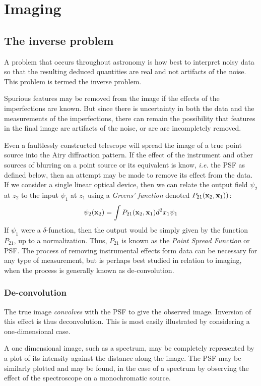 \chapter{Imaging}

\section{The inverse problem}

A problem that occurs throughout astronomy is how best to interpret noisy data so that the resulting deduced quantities are real and not artifacts of the noise. This problem is termed the inverse problem. 

Spurious features may be removed from the image if the effects of the imperfections are known. But since there is uncertainty in both the data and the measurements of the imperfections, there can remain the possibility that features in the final image are artifacts of the noise, or are are incompletely removed.

Even a faultlessly constructed telescope will spread the image of a true point source into the Airy diffraction pattern. If the effect of the instrument and other sources of blurring on a point source or its equivalent is know, {\it i.e.} the PSF as defined below, then an attempt may be made to remove its effect from the data. If we consider a single linear optical device, then we can relate the output field $\psi_2$ at $z_2$ to the input $\psi_1$ at $z_1$ using a {\it Greens' function} denoted $P_{21}({\bf x}_2,{\bf x}_1))$: 
\[
\psi_2({\bf x}_2)=\int P_{21}({\bf x}_2,{\bf x}_1)d^2x_1\psi_1
\]
If $\psi_1$ were a $\delta$-function, then the output would be simply given by the function $P_{21}$, up to a normalization. Thus, $P_{21}$ is known as the {\it Point Spread Function} or PSF. The process of removing instrumental effects form data can be necessary for any type of measurement, but is perhaps best studied in relation to imaging, when the process is generally known as de-convolution.

\subsection{De-convolution}

The true image {\it convolves} with the PSF to give the observed image. Inversion of this effect is thus deconvolution. This is most easily illustrated by considering a one-dimensional case. 

A one dimensional image, such as a spectrum, may be completely represented by a plot of its intensity against the distance along the image. The PSF may be similarly plotted and may be found, in the case of a spectrum by observing the effect of the spectroscope on a monochromatic source. 

